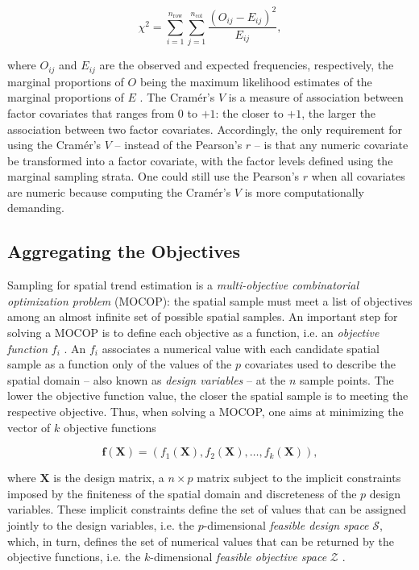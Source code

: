 \begin{equation}\label{eqn:chap08-chi-squared}
 \chi^2 = \sum_{i = 1}^{n_\text{row}}\sum_{j=1}^{n_\text{col}}\frac{(O_{ij} - E_{ij})^2}{E_{ij}},
\end{equation}

\noindent where $O_{ij}$ and $E_{ij}$ are the observed and expected frequencies, respectively, the marginal 
proportions of $O$ being the maximum likelihood estimates of the marginal proportions of $E$ 
\cite{Cramer1946, Agresti2002}. The Cramér's $V$ is a measure of association between factor covariates that 
ranges from $0$ to $+1$: the closer to $+1$, the larger the association between two factor covariates. 
Accordingly, the only requirement for using the Cramér's $V$ -- instead of the Pearson's $r$ -- is that any 
numeric covariate be transformed into a factor covariate, with the factor levels defined using the marginal 
sampling strata. One could still use the Pearson's $r$ when all covariates are numeric because computing the 
Cramér's $V$ is more computationally demanding.

\subsection{Aggregating the Objectives}

Sampling for spatial trend estimation is a \emph{multi-objective combinatorial optimization problem} (MOCOP): 
the spatial sample must meet a list of objectives among an almost infinite set of possible spatial samples. An 
important step for solving a MOCOP is to define each objective as a function, i.e. an \emph{objective function} 
$f_i$ \cite{Arora2011}. An $f_i$ associates a numerical value with each candidate spatial sample as a function 
only of the values of the $p$ covariates used to describe the spatial domain -- also known as \emph{design 
variables} \cite{Arora2011} -- at the $n$ sample points. The lower the objective function value, the closer the 
spatial sample is to meeting the respective objective. Thus, when solving a MOCOP, one aims at minimizing the 
vector of $k$ objective functions \cite{Arora2011}

\begin{equation}\label{eqn:chap08-mocop}
 \boldsymbol{f}(\boldsymbol{X}) = (f_1(\boldsymbol{X}), f_2(\boldsymbol{X}), \ldots, f_k(\boldsymbol{X})),
\end{equation}\label{eqn:chap08-mocop}

\noindent where $\boldsymbol{X}$ is the design matrix, a $n \times p$ matrix subject to the implicit 
constraints imposed by the finiteness of the spatial domain and discreteness of the $p$ design variables. 
These implicit constraints define the set of values that can be assigned jointly to the design variables, i.e. 
the $p$-dimensional \emph{feasible design space} $\mathcal{S}$, which, in turn, defines the set of numerical 
values that can be returned by the objective functions, i.e. the $k$-dimensional \emph{feasible objective 
space} $\mathcal{Z}$ \cite{MarlerEtAl2004}.

